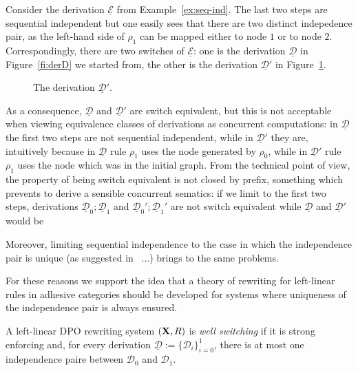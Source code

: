 \documentclass[a4paper,UKenglish,cleveref,pdftex, thm-restate,numberwithinsect,anonymous]{lipics}
\def\R{\mathsf{R}}
\def\X{\textbf {\textup{X}}}
\newcommand{\dder}[1]{\mathscr{#1}}
\newcommand{\der}[1]{\underline{\dder{#1}}}
\begin{document}
\begin{example}
  Consider the derivation $\der{E}$ from Example~\ref{ex:seq-ind}.
  The last two steps are sequential independent but one easily sees
  that there are two distinct indepedence pair, as the left-hand side
  of $\rho_1$ can be mapped either to node $1$ or to node
  $2$. Correspondingly, there
  are two switches of $\der{E}$: one is the derivation $\der{D}$ in
  Figure~\ref{fi:derD} we started from, the other is the derivation
  $\der{D}'$ in Figure~\ref{fi:derD1}.
  
  \begin{figure}
    
    \caption{The derivation $\der{D}'$.}
    \label{fi:derD1}
  \end{figure}
  
  As a consequence, $\der{D}$ and $\der{D}'$ are switch equivalent, but
  this is not acceptable when viewing equivalence classes of
  derivations as concurrent computations: in $\der{D}$ the first two
  steps are not sequential independent, while in $\der{D}'$ they are,
  intuitively because in $\der{D}$ rule $\rho_1$ uses the node
  generated by $\rho_0$, while in $\der{D}'$ rule $\rho_1$ uses the
  node which was in the initial graph. From the technical point of
  view, the property of being switch equivalent is not closed by
  prefix, something which prevents to derive a sensible concurrent
  sematics: if we limit to the first two steps, derivations
  $\der{D}_0; \der{D}_1$ and $\der{D}_0'; \der{D}_1'$ are not switch
  equivalent while $\der{D}$ and $\der{D}'$ would be
\end{example} 

Moreover, limiting sequential independence to the case in which the independence
pair is unique (as suggested in~ ...) brings to the same problems.

For these reasons we support the idea that a theory of rewriting for
left-linear rules in adhesive categories should be developed for
systems where uniqueness of the independence pair is always ensured.




\begin{definition}
A left-linear DPO rewriting system $(\X, \R)$ is \emph{well switching} if it is strong enforcing and, for every derivation $\der{D}:=\{\dder{D}_{i}\}_{i=0}^1$, there is at most one independence paire between $\dder{D}_0$ and $\dder{D}_1$.
\end{definition}
\end{document}
